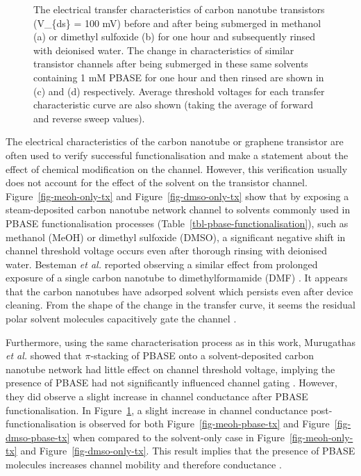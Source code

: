 \documentclass[
  a4paper,
]{scrbook}
\begin{document}
\begin{figure}
\begin{minipage}[t]{0.50\linewidth}
{{}

}

\subcaption{\label{fig-dmso-pbase-tx}}
\end{minipage}%

\caption{\label{fig-PBASE-vs-solvent-only}The electrical transfer
characteristics of carbon nanotube transistors (V\_\{ds\} = 100 mV)
before and after being submerged in methanol (a) or dimethyl sulfoxide
(b) for one hour and subsequently rinsed with deionised water. The
change in characteristics of similar transistor channels after being
submerged in these same solvents containing 1 mM PBASE for one hour and
then rinsed are shown in (c) and (d) respectively. Average threshold
voltages for each transfer characteristic curve are also shown (taking
the average of forward and reverse sweep values).}

\end{figure}

The electrical characteristics of the carbon nanotube or graphene
transistor are often used to verify successful functionalisation and
make a statement about the effect of chemical modification on the
channel. However, this verification usually does not account for the
effect of the solvent on the transistor channel.
Figure~\ref{fig-meoh-only-tx} and Figure~\ref{fig-dmso-only-tx} show
that by exposing a steam-deposited carbon nanotube network channel to
solvents commonly used in PBASE functionalisation processes
(Table~\ref{tbl-pbase-functionalisation}), such as methanol (MeOH) or
dimethyl sulfoxide (DMSO), a significant negative shift in channel
threshold voltage occurs even after thorough rinsing with deionised
water. Besteman \emph{et al.} reported observing a similar effect from
prolonged exposure of a single carbon nanotube to dimethylformamide
(DMF) \autocite{Besteman2003}. It appears that the carbon nanotubes have
adsorped solvent which persists even after device cleaning. From the
shape of the change in the transfer curve, it seems the residual polar
solvent molecules capacitively gate the channel
\autocite{Artyukhin2006,Heller2008}.

Furthermore, using the same characterisation process as in this work,
Murugathas \emph{et al.} \autocite{Murugathas2019b} showed that
\(\pi\)-stacking of PBASE onto a solvent-deposited carbon nanotube
network had little effect on channel threshold voltage, implying the
presence of PBASE had not significantly influenced channel gating
\autocite{Murugathas2019b}. However, they did observe a slight increase
in channel conductance after PBASE functionalisation. In
Figure~\ref{fig-PBASE-vs-solvent-only}, a slight increase in channel
conductance post-functionalisation is observed for both
Figure~\ref{fig-meoh-pbase-tx} and Figure~\ref{fig-dmso-pbase-tx} when
compared to the solvent-only case in Figure~\ref{fig-meoh-only-tx} and
Figure~\ref{fig-dmso-only-tx}. This result implies that the presence of
PBASE molecules increases channel mobility and therefore conductance
\autocite{Heller2008}.
\end{document}

